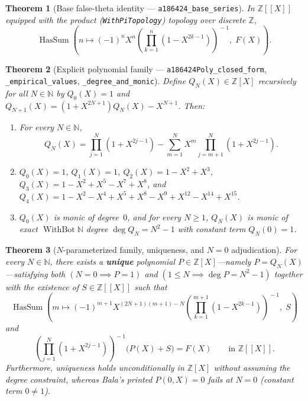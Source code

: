 \documentclass[11pt]{article}
\newcommand{\llbracket}{[\![}
\newcommand{\rrbracket}{]\!]}
\newtheorem{theorem}{Theorem}[section]
\theoremstyle{definition}
\newcommand{\N}{\mathbb{N}}
\newcommand{\Z}{\mathbb{Z}}
\begin{document}
\begin{theorem}[Base false-theta identity --- \texttt{a186424\_base\_series}]
\label{thm:base}
In $\Z\llbracket X \rrbracket$ equipped with the product (\texttt{WithPiTopology}) topology over discrete $\Z$,
\[
\operatorname{HasSum}\!\left(n \mapsto (-1)^n X^n \left(\prod_{k=1}^{n} (1 - X^{2k-1})\right)^{\!-1},\; F(X)\right).
\]
\end{theorem}

\begin{theorem}[Explicit polynomial family --- \texttt{a186424Poly\_closed\_form}, \texttt{\_empirical\_values}, \texttt{\_degree\_and\_monic}]
\label{thm:poly}
Define $Q_N(X) \in \Z[X]$ recursively for all $N \in \N$ by $Q_0(X) = 1$ and $Q_{N+1}(X) = (1 + X^{2N+1}) Q_N(X) - X^{N+1}$. Then:
\begin{enumerate}\setlength{\itemsep}{2pt}
\item[\textup{(a)}] For every $N \in \N$,
\[
Q_N(X) = \prod_{j=1}^{N} (1 + X^{2j-1}) - \sum_{m=1}^{N} X^m \prod_{j=m+1}^{N} (1 + X^{2j-1}).
\]
\item[\textup{(b)}] $Q_0(X) = 1$, $Q_1(X) = 1$, $Q_2(X) = 1 - X^2 + X^3$, $Q_3(X) = 1 - X^2 + X^5 - X^7 + X^8$, and $Q_4(X) = 1 - X^2 - X^4 + X^5 + X^8 - X^9 + X^{12} - X^{14} + X^{15}$.
\item[\textup{(c)}] $Q_0(X)$ is monic of degree~$0$, and for every $N \ge 1$, $Q_N(X)$ is monic of exact $\operatorname{WithBot}\N$ degree $\deg Q_N = N^2 - 1$ with constant term $Q_N(0) = 1$.
\end{enumerate}
\end{theorem}

\begin{theorem}[$N$-parameterized family, uniqueness, and $N = 0$ adjudication]
\label{thm:family}
For every $N \in \N$, there exists a \textbf{unique} polynomial $P \in \Z[X]$---namely $P = Q_N(X)$---satisfying both $(N = 0 \implies P = 1)$ and $(1 \le N \implies \deg P = N^2 - 1)$ together with the existence of $S \in \Z\llbracket X \rrbracket$ such that
\[
\operatorname{HasSum}\!\left(m \mapsto (-1)^{m+1} X^{(2N+1)(m+1) - N} \left(\prod_{k=1}^{m+1} (1 - X^{2k-1})\right)^{\!-1},\; S\right)
\]
and
\[
\left(\prod_{j=1}^{N} (1 + X^{2j-1})\right)^{\!-1} \bigl(P(X) + S\bigr) = F(X) \qquad \text{in } \Z\llbracket X \rrbracket.
\]
Furthermore, uniqueness holds unconditionally in $\Z[X]$ without assuming the degree constraint, whereas Bala's printed $P(0, X) = 0$ fails at $N = 0$ (constant term $0 \ne 1$).
\end{theorem}
\end{document}
